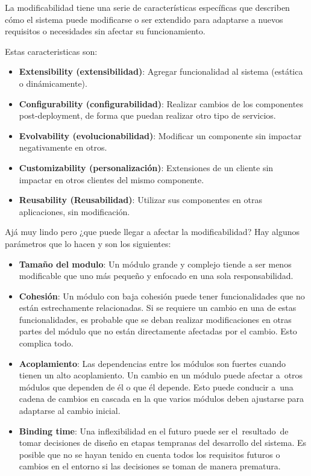 \documentclass{article}
\begin{document}
		La modificabilidad tiene una serie de características específicas que describen cómo el sistema puede modificarse o ser extendido para adaptarse a nuevos requisitos o necesidades sin afectar su funcionamiento.
		
		 Estas caracteristicas son: 
		\begin{itemize}		
			\item \textbf{Extensibility (extensibilidad)}: Agregar funcionalidad al sistema (estática o
			dinámicamente).
			
			\item \textbf{Configurability (configurabilidad)}: Realizar cambios de los componentes post-deployment, de forma que puedan realizar otro tipo de servicios.
			
			\item \textbf{Evolvability (evolucionabilidad)}: Modificar un componente sin impactar negativamente
			en otros.
			
			
			\item \textbf{Customizability (personalización)}: Extensiones de un cliente sin impactar en otros clientes del mismo componente.
			
			\item \textbf{Reusability (Reusabilidad)}: Utilizar sus componentes en otras aplicaciones, sin
			modificación.
			
		\end{itemize}
		
		Ajá muy lindo pero ¿que puede llegar a afectar la modificabilidad? Hay algunos parámetros que lo hacen y son los siguientes: 
		\begin{itemize}		
			\item \textbf{Tamaño del modulo}: Un módulo grande y complejo tiende a ser menos modificable que uno más pequeño y enfocado en una sola responsabilidad.
			
			\item \textbf{Cohesión}: Un módulo con baja cohesión puede tener funcionalidades que no están estrechamente relacionadas. Si se requiere un cambio en una de estas funcionalidades, es probable que se deban realizar modificaciones en otras partes del módulo que no están directamente afectadas por el cambio. Esto complica todo.
			
			\item \textbf{Acoplamiento}: Las dependencias entre los módulos son fuertes cuando tienen un alto acoplamiento. Un cambio en un módulo puede afectar a otros módulos que dependen de él o que él depende. Esto puede conducir a una cadena de cambios en cascada en la que varios módulos deben ajustarse para adaptarse al cambio inicial.
			
			
			\item \textbf{Binding time}: Una inflexibilidad en el futuro puede ser el resultado de tomar decisiones de diseño en etapas tempranas del desarrollo del sistema. Es posible que no se hayan tenido en cuenta todos los requisitos futuros o cambios en el entorno si las decisiones se toman de manera prematura.
			
		\end{itemize}
\end{document}
